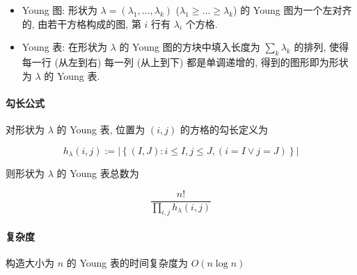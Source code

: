 \begin{itemize}
    \item Young 图: 形状为 \(\lambda=(\lambda_1,\dots,\lambda_k)\) (\(\lambda_1\geq \dots\geq \lambda_k\)) 的 Young 图为一个左对齐的, 由若干方格构成的图, 第 \(i\) 行有 \(\lambda_i\) 个方格.
    \item Young 表: 在形状为 \(\lambda\) 的 Young 图的方块中填入长度为 \(\sum_k \lambda_k\) 的排列, 使得每一行 (从左到右) 每一列 (从上到下) 都是单调递增的, 得到的图形即为形状为 \(\lambda\) 的 Young 表.
\end{itemize}

\paragraph{勾长公式}

对形状为 \(\lambda\) 的 Young 表, 位置为 \((i,j)\) 的方格的勾长定义为

\[
    h_{\lambda}(i,j):=\left|\left\{(I,J):i\leq I, j\leq J,(i=I \lor j=J)\right\}\right|
\]

则形状为 \(\lambda\) 的 Young 表总数为

\[
    \frac{n!}{\prod_{i,j} h_{\lambda}(i,j)}
\]

\paragraph{复杂度}

构造大小为 \(n\) 的 Young 表的时间复杂度为 \(O(n\log n)\)
